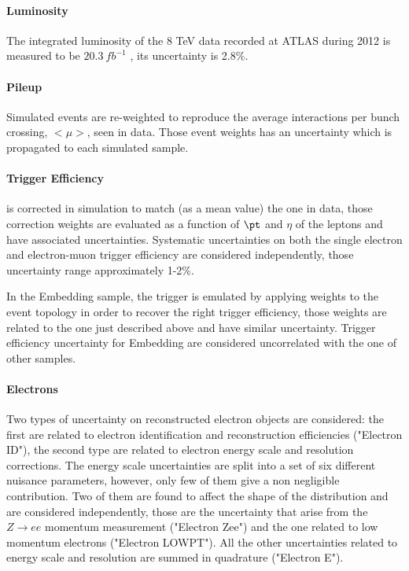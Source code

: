 \paragraph{Luminosity}
The integrated luminosity of the 8 TeV data recorded at ATLAS during 2012 is measured to be $20.3 ~ fb^{-1}$ \cite{luminosity}, its uncertainty  is  2.8\%.

\paragraph{Pileup}
Simulated events are re-weighted to reproduce the average interactions per bunch crossing, $<\mu>$, seen in data. 
Those event weights has an uncertainty which is propagated to each simulated sample.

\paragraph{Trigger Efficiency}
is corrected in simulation to match (as a mean value) the one in data, those correction weights 
are evaluated as a function of $\pt$ and $\eta$ of the leptons and have associated uncertainties. 
Systematic uncertainties on both the single electron and electron-muon trigger efficiency are considered independently,  
those uncertainty range approximately 1-2\%.

In the Embedding sample, the trigger is emulated by applying weights to the event
topology in order to recover the right trigger efficiency, those weights are related to the one just described above
and have similar uncertainty. Trigger efficiency uncertainty for Embedding are considered uncorrelated with 
the one of other samples.

\paragraph{Electrons}
Two types of uncertainty on reconstructed electron objects are considered:
the first are related to electron identification and reconstruction efficiencies ("Electron ID"), 
the second type are related to electron energy scale and resolution corrections.
The energy scale uncertainties are split into a set of six different nuisance parameters, 
however, only few of them give a non negligible contribution. Two of them are found
to affect the shape of the \mmc distribution and are considered independently, those are the uncertainty
that arise from the $Z \rightarrow ee$ momentum measurement ("Electron Zee") 
and the one related to low momentum electrons ("Electron LOWPT"). 
All the other uncertainties related to energy scale and resolution are summed in quadrature ("Electron E").

